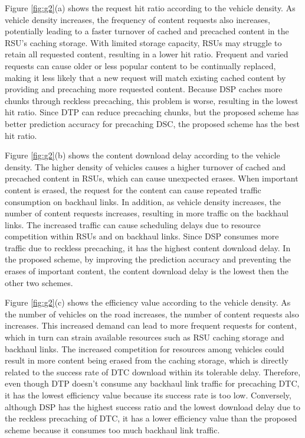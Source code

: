 \documentclass[journal]{IEEEtran}
\begin{document}
Figure \ref{fig:g2}(a) shows the request hit ratio according to the vehicle density.
As vehicle density increases, the frequency of content requests also increases, potentially leading to a faster turnover of cached and precached content in the RSU's caching storage.
With limited storage capacity, RSUs may struggle to retain all requested content, resulting in a lower hit ratio.
Frequent and varied requests can cause older or less popular content to be continually replaced, making it less likely that a new request will match existing cached content by providing and precaching more requested content.
Because DSP caches more chunks through reckless precaching, this problem is worse, resulting in the lowest hit ratio.
Since DTP can reduce precaching chunks, but the proposed scheme has better prediction accuracy for precaching DSC, the proposed scheme has the best hit ratio.

Figure \ref{fig:g2}(b) shows the content download delay according to the vehicle density.
The higher density of vehicles causes a higher turnover of cached and precached content in RSUs, which can cause unexpected erases.
When important content is erased, the request for the content can cause repeated traffic consumption on backhaul links.
In addition, as vehicle density increases, the number of content requests increases, resulting in more traffic on the backhaul links.
The increased traffic can cause scheduling delays due to resource competition within RSUs and on backhaul links.
Since DSP consumes more traffic due to reckless precaching, it has the highest content download delay.
In the proposed scheme, by improving the prediction accuracy and preventing the erases of important content, the content download delay is the lowest then the other two schemes.

Figure \ref{fig:g2}(c) shows the efficiency value according to the vehicle density.
As the number of vehicles on the road increases, the number of content requests also increases.
This increased demand can lead to more frequent requests for content, which in turn can strain available resources such as RSU caching storage and backhaul links.
The increased competition for resources among vehicles could result in more content being erased from the caching storage, which is directly related to the success rate of DTC download within its tolerable delay.
Therefore, even though DTP doesn't consume any backhaul link traffic for precaching DTC, it has the lowest efficiency value because its success rate is too low.
Conversely, although DSP has the highest success ratio and the lowest download delay due to the reckless precaching of DTC, it has a lower efficiency value than the proposed scheme because it consumes too much backhaul link traffic.
\end{document}
